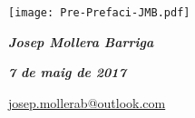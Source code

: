 \vspace*{1cm}
\hfill
\begin{minipage}[b]{35mm}
    \texttt{[image: Pre-Prefaci-JMB.pdf]}
\end{minipage}

{\large

    \hfill \textbf{\textsl{Josep Mollera Barriga}}

    \hfill \textbf{\textsl{7 de maig de 2017}}

    \hfill {\small \href{mailto:josep.mollerab@outlook.com}{\faEnvelope\hspace{2mm}josep.mollerab@outlook.com} }

}
